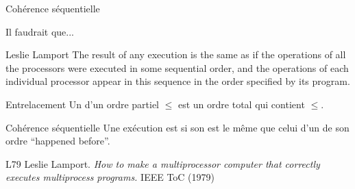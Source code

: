 
\begingroup

\begin{frame}[fragile]{Cohérence séquentielle}

  \begin{block}{Il faudrait que...}
    \begin{shadequote}{Leslie Lamport}
      The result of any execution is the same as if the operations of all the processors were executed in some sequential order,
      and the operations of each individual processor appear in this sequence in the order specified by its program.
    \end{shadequote}
  \end{block}

  \vfill

  \begin{block}{Entrelacement}
    Un  d'un ordre partiel $\le$ est un ordre total qui contient $\le$. 
  \end{block}
  \begin{block}{Cohérence séquentielle}
    Une exécution est  si son  est \alert{le même que} celui d'un  de son ordre ``happened before''.
  \end{block}

  \vfill
  \begin{citing}
  \item[L79] Leslie Lamport. \textit{How to make a multiprocessor computer that correctly executes multiprocess programs.} IEEE ToC (1979)
  \end{citing}

\end{frame}

\endgroup
\endinput
